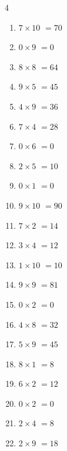 \begin{multicols}{4}
\begin{enumerate}
  \item $7\times 10$
        $=70$

  \item $0\times 9$
        $=0$

  \item $8\times 8$
        $=64$

  \item $9\times 5$
        $=45$

\columnbreak %

\resetques

  \item $4\times 9$
        $=36$

  \item $7\times 4$
        $=28$

  \item $0\times 6$
        $=0$

  \item $2\times 5$
        $=10$

  \item $0\times 1$
        $=0$

  \item $9\times 10$
        $=90$

  \item $7\times 2$
        $=14$

  \item $3\times 4$
        $=12$

  \item $1\times 10$
        $=10$

  \item $9\times 9$
        $=81$

  \item $0\times 2$
        $=0$

  \item $4\times 8$
        $=32$

  \item $5\times 9$
        $=45$

  \item $8\times 1$
        $=8$

  \item $6\times 2$
        $=12$

  \item $0\times 2$
        $=0$

  \item $2\times 4$
        $=8$

  \item $2\times 9$
        $=18$


\end{enumerate}
\end{multicols}
